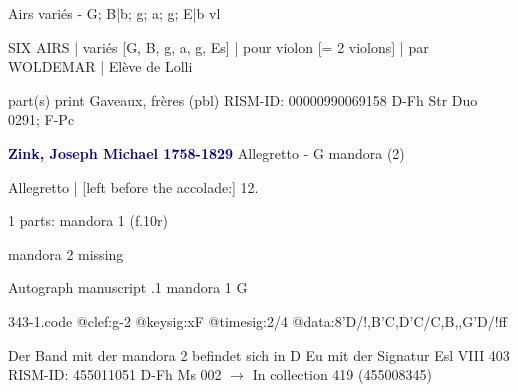 \documentclass[twocolumn]{book}
\begin{document}
\newline Airs variés - G; B|b; g; a; g; E|b
 vl
\newline \begin{itshape}SIX AIRS | variés [G, B, g, a, g, Es] | pour violon [= 2 violons] | par WOLDEMAR | Elève de Lolli\end{itshape} 
\newline \textcolor{darkblue}{}  part(s)
\newline print
\newline Gaveaux, frères  (pbl)
\newline RISM-ID: 00000990069158
\newline D-Fh  Str Duo 0291; F-Pc
\newline \par \vspace{7pt} \textcolor{darkblue}{\textbf{Zink, Joseph Michael  1758-1829}}
\newline Allegretto - G
\newline mandora (2)
\newline \begin{itshape}[f.10r, at left:] Allegretto | [left before the accolade:] 12.\end{itshape} 
\newline \textcolor{darkblue}{}  1 parts: mandora 1  (f.10r)
\newline \begin{small} mandora 2 missing\end{small} 
\newline Autograph manuscript
.1  mandora 1  G  
\begin{filecontents*}{343-1.code}
@clef:g-2
@keysig:xF
@timesig:2/4
@data:8'D/!,B'C,D'C/C,B,,G'D/!ff
\end{filecontents*}
\newline
%

\newline Der Band mit der mandora 2 befindet sich in D Eu mit der Signatur Esl VIII 403
\newline RISM-ID: 455011051
\newline D-Fh  Ms 002
\newline $\rightarrow$ In collection 419 (455008345)
      
\end{document}
